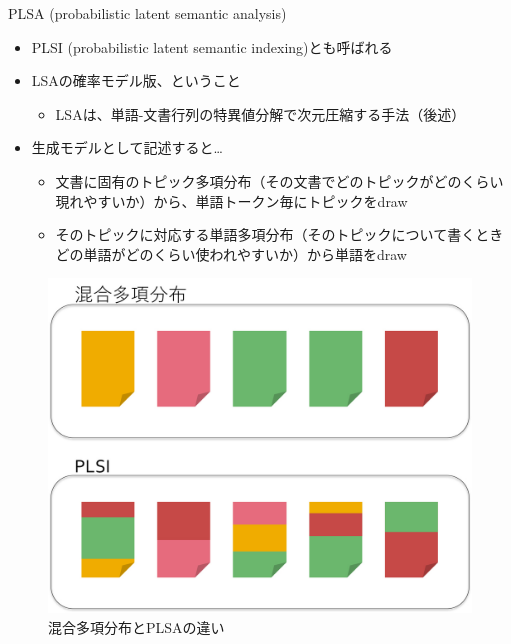 \documentclass[aspectratio=169,unicode,dvipdfmx,14pt]{beamer}
\begin{document}
\begin{frame}{PLSA (probabilistic latent semantic analysis)}
\begin{itemize}
\item PLSI (probabilistic latent semantic indexing)とも呼ばれる
\item LSAの確率モデル版、ということ
\begin{itemize}
\item LSAは、単語-文書行列の特異値分解で次元圧縮する手法（後述）
\end{itemize}
\item 生成モデルとして記述すると…
\begin{itemize}
\item 文書に固有のトピック多項分布（その文書でどのトピックがどのくらい現れやすいか）から、単語トークン毎にトピックをdraw
\item そのトピックに対応する単語多項分布（そのトピックについて書くときどの単語がどのくらい使われやすいか）から単語をdraw
\end{itemize}

\end{itemize}

\end{frame}

\begin{frame}
\begin{figure}[htbp]
\begin{center}
\includegraphics[scale=.21]{PLSI1.jpg}
\caption{混合多項分布とPLSAの違い}
\label{}
\end{center}
\end{figure}\end{frame}
\end{document}
